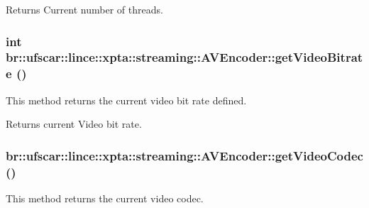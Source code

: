 \begin{DoxyReturn}{Returns}
Current number of threads. 
\end{DoxyReturn}
\hypertarget{classbr_1_1ufscar_1_1lince_1_1xpta_1_1streaming_1_1AVEncoder_ad59e0ed12e65047454d4f6031ade8a19}{
\subsubsection[{getVideoBitrate}]{\setlength{\rightskip}{0pt plus 5cm}int br::ufscar::lince::xpta::streaming::AVEncoder::getVideoBitrate ()}}
\label{classbr_1_1ufscar_1_1lince_1_1xpta_1_1streaming_1_1AVEncoder_ad59e0ed12e65047454d4f6031ade8a19}


This method returns the current video bit rate defined. 

\begin{DoxyReturn}{Returns}
current Video bit rate. 
\end{DoxyReturn}
\hypertarget{classbr_1_1ufscar_1_1lince_1_1xpta_1_1streaming_1_1AVEncoder_a3cf3b06d1d90018ea7d32e56fc5d00f6}{
\subsubsection[{getVideoCodec}]{ br::ufscar::lince::xpta::streaming::AVEncoder::getVideoCodec ()}}
\label{classbr_1_1ufscar_1_1lince_1_1xpta_1_1streaming_1_1AVEncoder_a3cf3b06d1d90018ea7d32e56fc5d00f6}


This method returns the current video codec. 


